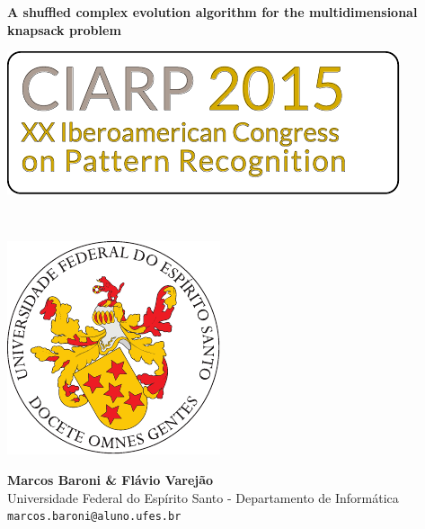 \documentclass[a0,portrait]{a0poster}
\begin{document}


\begin{minipage}[c]{0.70\linewidth}
\veryHuge \color{NavyBlue} \textbf{A shuffled complex evolution algorithm for
the multidimensional knapsack problem} \color{Black} %
\end{minipage}
\begin{minipage}[c]{0.30\linewidth}
  \hfill
  \includegraphics[scale=2.5]{ciarp-logo}
\end{minipage}\\[1cm]

\begin{minipage}[c]{0.10\linewidth}
  \vspace{-15mm}
  \includegraphics[scale=1.5]{../../brasao-ufes}
\end{minipage}
\begin{minipage}[c]{0.80\linewidth}
  \huge \textbf{Marcos Baroni \& Fl\'avio Varej\~ao}\\[0.5cm] %
  \huge Universidade Federal do Espírito Santo - Departamento de Inform\'atica\\[0.4cm] %
  \Large \texttt{marcos.baroni@aluno.ufes.br}\\
\end{minipage}
\end{document}
